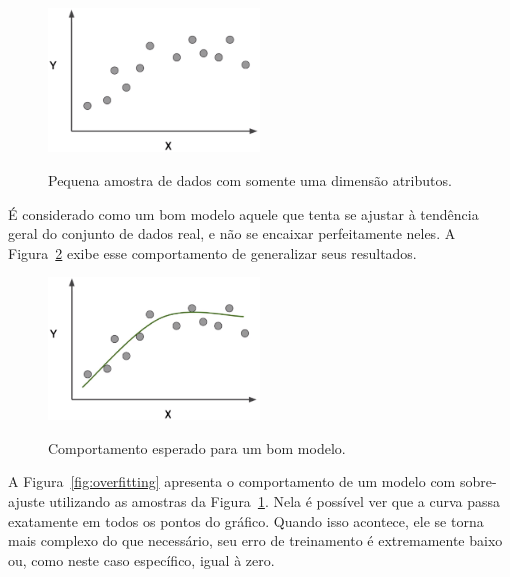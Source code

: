             \begin{figure}[H]
                \centering
                \caption{Pequena amostra de dados com somente uma dimensão atributos.}
                \includegraphics[width=0.5\textwidth]{fig/2-fundamentacao/overfitting/dados_simples.png}
                \label{fig:dados_simples}
            \end{figure}
    
            É considerado como um bom modelo aquele que tenta se ajustar à tendência geral do conjunto de dados real, e não se encaixar perfeitamente neles. A Figura~\ref{fig:modelo_bom} exibe esse comportamento de generalizar seus resultados.
    
            \begin{figure}[H]
                \centering
                \caption{Comportamento esperado para um bom modelo.}
                \includegraphics[width=0.5\textwidth]{fig/2-fundamentacao/overfitting/modelo_bom.png}
                \label{fig:modelo_bom}
            \end{figure}
            
            A Figura~\ref{fig:overfitting} apresenta o comportamento de um  modelo com sobre-ajuste utilizando as amostras da Figura~\ref{fig:dados_simples}. Nela é possível ver que a curva passa exatamente em todos os pontos do gráfico. Quando isso acontece, ele se torna mais complexo do que necessário, seu erro de treinamento é extremamente baixo ou, como neste caso específico, igual à zero.
            
